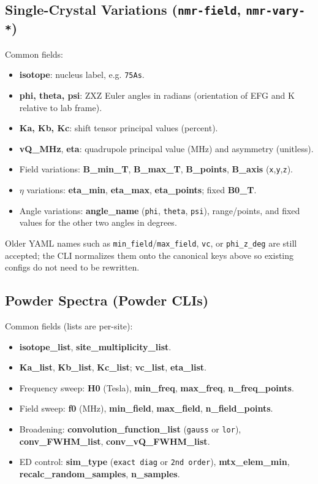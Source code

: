 \documentclass[12pt]{article}
\begin{document}
\subsection{Single-Crystal Variations (\texttt{nmr-field}, \texttt{nmr-vary-*})}
Common fields:
\begin{itemize}
  \item \textbf{isotope}: nucleus label, e.g. \verb|75As|.
  \item \textbf{phi, theta, psi}: ZXZ Euler angles in radians (orientation of EFG and K relative to lab frame).
  \item \textbf{Ka, Kb, Kc}: shift tensor principal values (percent).
  \item \textbf{vQ\_MHz}, \textbf{eta}: quadrupole principal value (MHz) and asymmetry (unitless).
  \item Field variations: \textbf{B\_min\_T}, \textbf{B\_max\_T}, \textbf{B\_points}, \textbf{B\_axis} (\verb|x|,\verb|y|,\verb|z|).
  \item $\eta$ variations: \textbf{eta\_min}, \textbf{eta\_max}, \textbf{eta\_points}; fixed \textbf{B0\_T}.
  \item Angle variations: \textbf{angle\_name} (\verb|phi|, \verb|theta|, \verb|psi|), range/points, and fixed values for the other two angles in degrees.
\end{itemize}
Older YAML names such as \verb|min_field|/\verb|max_field|, \verb|vc|, or \verb|phi_z_deg| are still accepted; the CLI normalizes them onto the canonical keys above so existing configs do not need to be rewritten.

\subsection{Powder Spectra (Powder CLIs)}
Common fields (lists are per-site):
\begin{itemize}
  \item \textbf{isotope\_list}, \textbf{site\_multiplicity\_list}.
  \item \textbf{Ka\_list}, \textbf{Kb\_list}, \textbf{Kc\_list}; \textbf{vc\_list}, \textbf{eta\_list}.
\item Frequency sweep: \textbf{H0} (Tesla), \textbf{min\_freq}, \textbf{max\_freq}, \textbf{n\_freq\_points}.
\item Field sweep: \textbf{f0} (MHz), \textbf{min\_field}, \textbf{max\_field}, \textbf{n\_field\_points}.
  \item Broadening: \textbf{convolution\_function\_list} (\verb|gauss| or \verb|lor|), \textbf{conv\_FWHM\_list}, \textbf{conv\_vQ\_FWHM\_list}.
  \item ED control: \textbf{sim\_type} (\verb|exact diag| or \verb|2nd order|), \textbf{mtx\_elem\_min}, \textbf{recalc\_random\_samples}, \textbf{n\_samples}.
\end{itemize}
\end{document}
